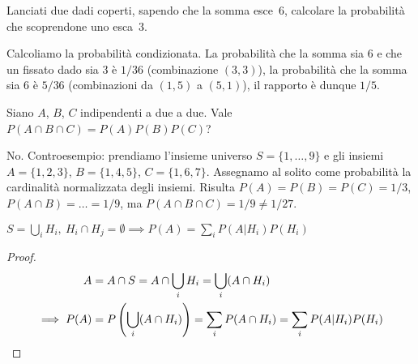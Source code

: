 
\begin{ex}
	Lanciati due dadi coperti, sapendo che la somma esce~6, calcolare la probabilità che scoprendone uno esca~3.
\end{ex}

\begin{solution}
	Calcoliamo la probabilità condizionata. La probabilità che la somma sia 6 e che un fissato dado sia 3 è $1/36$ (combinazione $(3,3)$), la probabilità che la somma sia 6 è $5/36$ (combinazioni da $(1,5)$ a $(5,1)$), il rapporto è dunque $1/5$.
\end{solution}

\begin{ex}
	Siano $A$, $B$, $C$ indipendenti a due a due. Vale $P(A\cap B\cap C)=P(A)P(B)P(C)$?
\end{ex}

\begin{solution}
	No. Controesempio: prendiamo l'insieme universo
	$S = \{1,\dots,9\}$
	e gli insiemi
	$A = \{1, 2, 3\}$,
	$B = \{1, 4, 5\}$,
	$C = \{1, 6, 7\}$.
	Assegnamo al solito come probabilità la cardinalità normalizzata degli insiemi.
	Risulta $P(A)=P(B)=P(C)=1/3$, $P(A\cap B)=\dots=1/9$, ma $P(A\cap B\cap C)=1/9\neq1/27$.
\end{solution}

\begin{teo}
	$S=\bigcup_iH_i,\ H_i\cap H_j=\emptyset\implies P(A)=\sum_iP(A|H_i)P(H_i)$
\end{teo}

\begin{proof}
	\begin{align*}
		A &= A\cap S = A\cap \bigcup_iH_i = \bigcup_i(A\cap H_i) \\
		\implies P(A) &= P\left(\bigcup_i(A\cap H_i)\right) = \sum_i P(A\cap H_i) = \sum_i P(A|H_i)P(H_i) \qedhere
	\end{align*}
\end{proof}
